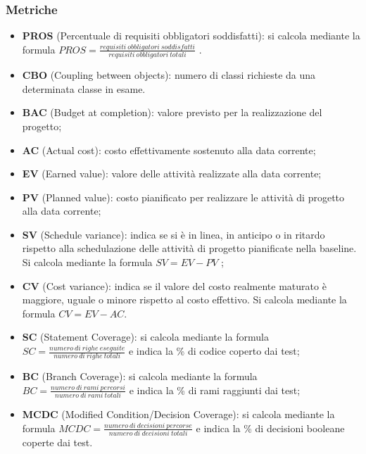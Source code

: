 \subsubsection{Metriche}
\begin{itemize}
	\item \textbf{PROS} (Percentuale di requisiti obbligatori soddisfatti): si calcola mediante la formula \newline $PROS = \frac{requisiti\ obbligatori\ soddisfatti}{requisiti\ obbligatori\ totali}$ .
\end{itemize}
\begin{itemize}
	\item \textbf{CBO} (Coupling between objects): numero di classi richieste da una determinata classe in esame.
\end{itemize}
\begin{itemize}
	\item \textbf{BAC} (Budget at completion): valore previsto per la realizzazione del progetto;
	\item \textbf{AC} (Actual cost): costo effettivamente sostenuto alla data corrente;
	\item \textbf{EV} (Earned value): valore delle attività realizzate alla data corrente;
	\item \textbf{PV} (Planned value): costo pianificato per realizzare le attività di progetto alla data corrente;
	\item \textbf{SV} (Schedule variance): indica se si è in linea, in anticipo o in ritardo rispetto alla schedulazione delle attività di progetto pianificate nella baseline. Si calcola mediante la formula $SV = EV - PV$ ;
	\item \textbf{CV} (Cost variance): indica se il valore del costo realmente maturato è maggiore, uguale o minore rispetto al costo effettivo. Si calcola mediante la formula $CV = EV - AC$.
\end{itemize}
\begin{itemize}
	\item \textbf{SC} (Statement Coverage): si calcola mediante la formula $SC = \frac{numero\ di\ righe\ eseguite}{numero\ di\ righe\ totali}$ e indica la \% di codice coperto dai test;
	\item \textbf{BC} (Branch Coverage): si calcola mediante la formula $BC = \frac{numero\ di\ rami\ percorsi}{numero\ di\ rami\ totali}$ e indica la \% di rami raggiunti dai test;
	\item \textbf{MCDC} (Modified Condition/Decision Coverage): si calcola mediante la formula \newline $MCDC = \frac{numero\ di\ decisioni\ percorse}{numero\ di\ decisioni\ totali}$ e indica la \% di decisioni booleane coperte dai test. 
\end{itemize}
